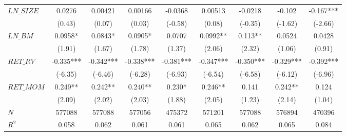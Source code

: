 \begin{tabular}{lcccccccc}
$LN\_SIZE$ & 0.0276  & 0.00421 & 0.00166 & -0.0368 & 0.00513 & -0.0218 & -0.102  & -0.167*** \\
        & (0.43)  & (0.07)  & (0.03)  & (-0.58) & (0.08)  & (-0.35) & (-1.62) & (-2.66) \\
$LN\_BM$ & 0.0958* & 0.0843* & 0.0905* & 0.0707  & 0.0992** & 0.113** & 0.0524  & 0.0428 \\
        & (1.91)  & (1.67)  & (1.78)  & (1.37)  & (2.06)  & (2.32)  & (1.06)  & (0.91) \\
$RET\_RV$ & -0.335*** & -0.342*** & -0.338*** & -0.381*** & -0.347*** & -0.350*** & -0.329*** & -0.392*** \\
        & (-6.35) & (-6.46) & (-6.28) & (-6.93) & (-6.54) & (-6.58) & (-6.12) & (-6.96) \\
$RET\_MOM$ & 0.249** & 0.242** & 0.240** & 0.230*  & 0.246** & 0.141   & 0.242** & 0.124 \\
        & (2.09)  & (2.02)  & (2.03)  & (1.88)  & (2.05)  & (1.23)  & (2.14)  & (1.04) \bigstrut[b]\\
\hline
$N$     & 577088  & 577088  & 577056  & 475372  & 571201  & 577088  & 576894  & 470396 \bigstrut[t]\\
$R^2$   & 0.058   & 0.062   & 0.061   & 0.061   & 0.065   & 0.062   & 0.065   & 0.084 \bigstrut[b]\\
\hline
\end{tabular}%
